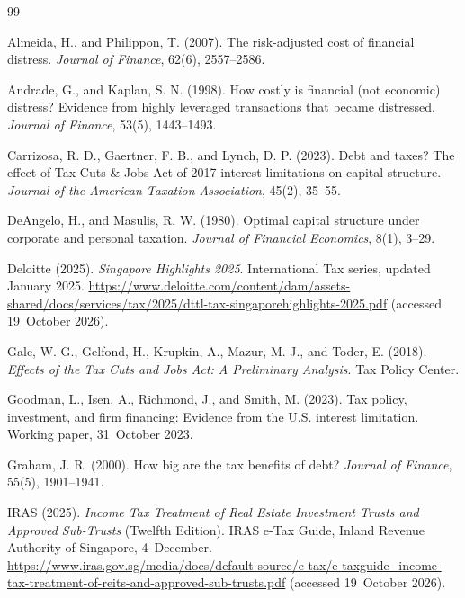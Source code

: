 \begin{thebibliography}{99}

Almeida, H., and Philippon, T. (2007). The risk-adjusted cost of financial distress. \textit{Journal of Finance}, 62(6), 2557--2586.

Andrade, G., and Kaplan, S. N. (1998). How costly is financial (not economic) distress? Evidence from highly leveraged transactions that became distressed. \textit{Journal of Finance}, 53(5), 1443--1493.

Carrizosa, R. D., Gaertner, F. B., and Lynch, D. P. (2023). Debt and taxes? The effect of Tax Cuts \& Jobs Act of 2017 interest limitations on capital structure. \textit{Journal of the American Taxation Association}, 45(2), 35--55.

DeAngelo, H., and Masulis, R. W. (1980). Optimal capital structure under corporate and personal taxation. \textit{Journal of Financial Economics}, 8(1), 3--29.

Deloitte (2025). \textit{Singapore Highlights 2025}. International Tax series, updated January 2025. \url{https://www.deloitte.com/content/dam/assets-shared/docs/services/tax/2025/dttl-tax-singaporehighlights-2025.pdf} (accessed 19~October 2026).

Gale, W. G., Gelfond, H., Krupkin, A., Mazur, M. J., and Toder, E. (2018). \textit{Effects of the Tax Cuts and Jobs Act: A Preliminary Analysis}. Tax Policy Center.

Goodman, L., Isen, A., Richmond, J., and Smith, M. (2023). Tax policy, investment, and firm financing: Evidence from the U.S. interest limitation. Working paper, 31~October 2023.

Graham, J. R. (2000). How big are the tax benefits of debt? \textit{Journal of Finance}, 55(5), 1901--1941.

IRAS (2025). \textit{Income Tax Treatment of Real Estate Investment Trusts and Approved Sub-Trusts} (Twelfth Edition). IRAS e-Tax Guide, Inland Revenue Authority of Singapore, 4~December. \url{https://www.iras.gov.sg/media/docs/default-source/e-tax/e-taxguide_income-tax-treatment-of-reits-and-approved-sub-trusts.pdf} (accessed 19~October 2026).


\end{thebibliography}
